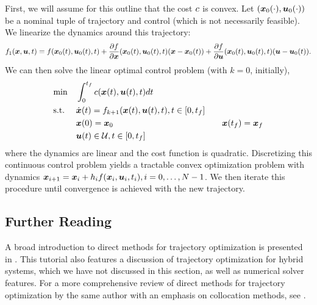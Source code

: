 First, we will assume for this outline that the cost $c$ is convex. Let $(\bm{x}_0(\cdot),\bm{u}_0(\cdot))$ be a nominal tuple of trajectory and control (which is not necessarily feasible). We linearize the dynamics around this trajectory:
\begin{equation}
    f_1(\bm{x},\bm{u},t) = f(\bm{x}_0(t),\bm{u}_0(t),t) + \frac{\partial f}{\partial \bm{x}}(\bm{x}_0(t), \bm{u}_0(t), t) (\bm{x} - \bm{x}_0(t)) + \frac{\partial f}{\partial \bm{u}}(\bm{x}_0(t), \bm{u}_0(t), t) (\bm{u} - \bm{u}_0(t)).
\end{equation}
We can then solve the linear optimal control problem (with $k=0$, initially),
\begin{equation}
\begin{aligned}
\label{eq:ocp}
& {\min} & & \int_{0}^{t_f} c(\bm{x}(t),\bm{u}(t),t) dt\\
& \textrm{s.t.} & & \dot{\bm{x}}(t) = f_{k+1}(\bm{x}(t),\bm{u}(t),t), t \in [0,t_f]\\
& & & \bm{x}(0) = \bm{x}_0
& & & \bm{x}(t_f) = \bm{x}_f\\
& & & \bm{u}(t) \in \mathcal{U}, t \in [0,t_f]
\end{aligned}
\end{equation}
where the dynamics are linear and the cost function is quadratic. Discretizing this continuous control problem yields a tractable convex optimization problem with dynamics $\bm{x}_{i+1} = \bm{x}_i + h_i f(\bm{x}_i,\bm{u}_i,t_i), i=0, \ldots, N-1$. We then iterate this procedure until convergence is achieved with the new trajectory.




\subsection{Further Reading}

A broad introduction to direct methods for trajectory optimization is presented in \cite{kelly2017transcription}. This tutorial also features a discussion of trajectory optimization for hybrid systems, which we have not discussed in this section, as well as numerical solver features. For a more comprehensive review of direct methods for trajectory optimization by the same author with an emphasis on collocation methods, see \cite{kelly2017introduction}.